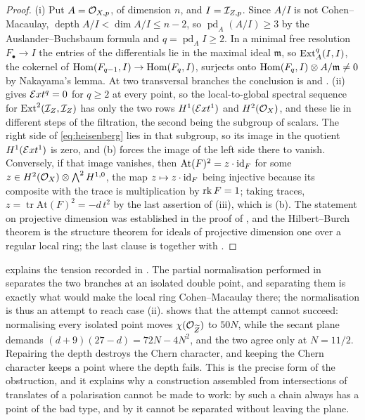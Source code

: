 \begin{proof}
(i) Put $A=\mathcal{O}_{X,p}$, of dimension $n$, and $I=\mathcal{I}_{Z,p}$. Since $A/I$ is not
Cohen--Macaulay, $\operatorname{depth}A/I<\dim A/I\le n-2$, so
$\operatorname{pd}_{A}(A/I)\ge3$ by the Auslander--Buchsbaum formula and
$q=\operatorname{pd}_{A}I\ge2$. In a minimal free resolution
$F_{\bullet}\to I$ the entries of the differentials lie in the maximal ideal
$\mathfrak m$, so $\operatorname{Ext}^{q}_{A}(I,I)$, the cokernel of
$\operatorname{Hom}(F_{q-1},I)\to\operatorname{Hom}(F_{q},I)$, surjects onto
$\operatorname{Hom}(F_{q},I)\otimes A/\mathfrak m\ne0$ by Nakayama's lemma. At two
transversal branches the conclusion is  and
. (ii)  gives
$\mathcal{E} xt^{q}=0$ for $q\ge2$ at every point, so the local-to-global spectral
sequence for $\operatorname{Ext}^{2}(\mathcal{I}_{Z},\mathcal{I}_{Z})$ has only the two rows
$H^{1}(\mathcal{E} xt^{1})$ and $H^{2}(\mathcal{O}_{X})$, and these lie in different steps of
the filtration, the second being the subgroup of scalars. The right side of
\eqref{eq:heisenberg} lies in that subgroup, so its image in the quotient
$H^{1}(\mathcal{E} xt^{1})$ is zero, and (b) forces the image of the left side there
to vanish. Conversely, if that image vanishes, then
$\mathrm{At}(F)^{2}=z\cdot\operatorname{id}_{F}$ for some
$z\in H^{2}(\mathcal{O}_{X})\otimes\bigwedge^{2}H^{1,0}$, the map
$z\mapsto z\cdot\operatorname{id}_{F}$ being injective because its composite with the
trace is multiplication by $\operatorname{rk} F=1$; taking traces,
$z=\operatorname{tr}\mathrm{At}(F)^{2}=-d\,t^{2}$ by the last assertion of
(iii), which is (b). The statement on projective dimension
was established in the proof of , and the Hilbert--Burch theorem is the
structure theorem for ideals of projective dimension one over a regular local
ring; the last clause is  together with
.
\end{proof}

\begin{remark}%
\label{rem:normalisationcm}
 explains the tension recorded in
. The partial normalisation performed in
 separates the two branches at an isolated double point,
and separating them is exactly what would make the local ring
Cohen--Macaulay there; the normalisation is thus an attempt to reach case
(ii).  shows that the attempt cannot succeed:
normalising every isolated point moves $\chi(\mathcal{O}_{\widetilde Z})$ to $50N$,
while the secant plane demands $(d+9)(27-d)=72N-4N^{2}$, and the two agree
only at $N=11/2$. Repairing the depth destroys the Chern character, and
keeping the Chern character keeps a point where the depth fails. This is the
precise form of the obstruction, and it explains why a construction
assembled from intersections of translates of a polarisation cannot be made
to work: by  such a chain always has a point of
the bad type, and by  it cannot be separated
without leaving the plane.
\end{remark}

